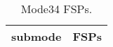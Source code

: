 \begin{table}[h!]
\begin{center}
\begin{tabular}{cl}
\hline
submode& FSPs\\
\hline
\hline
\end{tabular}
\label{tab:Mode34FSPs}
\caption{Mode34 FSPs.}
\end{center}
\end{table}
